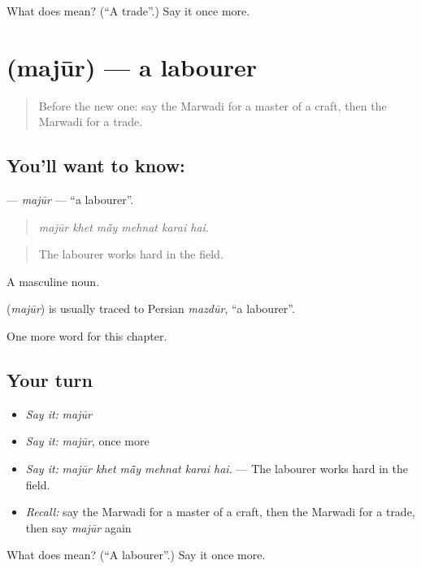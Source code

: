\begin{tcolorbox}[breakable,colback=teal!4,colframe=teal!35!black,title={Before you move on}]
What does  mean? (\textquotedblleft{}A trade\textquotedblright{}.) Say it once more.
\end{tcolorbox}
\section[\texorpdfstring{\mw{मजूर} (majūr)}{मजूर (majūr)}]{ (majūr) — a labourer}

\label{lesson:MW-C288-majur}



\begin{quote}
Before the new one: say the Marwadi for a master of a craft, then the Marwadi for a trade.
\end{quote}

\subsection*{You'll want to know: }
\textbf{} — \emph{majūr} — \textquotedblleft{}a labourer\textquotedblright{}.

\begin{quote}
     
\end{quote}

\begin{quote}
\emph{majūr khet mā̃y mehnat karai hai.}
\end{quote}

\begin{quote}
The labourer works hard in the field.
\end{quote}

A masculine noun.

\begin{cousinweb}
\textbf{} (\emph{majūr}) is usually traced to Persian \emph{mazdūr}, \textquotedblleft{}a labourer\textquotedblright{}.
\end{cousinweb}

\begin{grammarlens}[title={What you've built}]
One more word for this chapter.
\end{grammarlens}

\subsection*{Your turn}
\begin{itemize}
\raggedright
  \item \emph{Say it:} \emph{majūr}
  \item \emph{Say it:} \emph{majūr}, once more
  \item \emph{Say it:} \emph{majūr khet mā̃y mehnat karai hai.} — The labourer works hard in the field.
  \item \emph{Recall:} say the Marwadi for a master of a craft, then the Marwadi for a trade, then say \emph{majūr} again
\end{itemize}

\begin{tcolorbox}[breakable,colback=teal!4,colframe=teal!35!black,title={Before you move on}]
What does  mean? (\textquotedblleft{}A labourer\textquotedblright{}.) Say it once more.
\end{tcolorbox}
